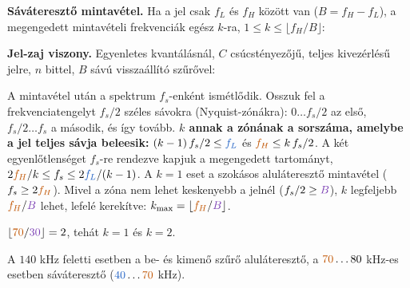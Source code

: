 \begin{elmelet}
\textbf{Sáváteresztő mintavétel.} Ha a jel csak $f_L$ és $f_H$ között van ($B=f_H-f_L$), a megengedett mintavételi frekvenciák egész $k$-ra, $1\le k\le\lfloor f_H/B\rfloor$:
\begin{center}\end{center}


\textbf{Jel-zaj viszony.} Egyenletes kvantálásnál, $C$ csúcstényezőjű, teljes kivezérlésű jelre, $n$ bittel, $B$ sávú visszaállító szűrővel:
\begin{center}\end{center}

\end{elmelet}

A mintavétel után a spektrum $f_s$-enként ismétlődik. Osszuk fel a frekvenciatengelyt $f_s/2$ széles sávokra (Nyquist-zónákra): $0\ldots f_s/2$ az első, $f_s/2\ldots f_s$ a második, és így tovább. \textbf{$k$ annak a zónának a sorszáma, amelybe a jel teljes sávja beleesik:} $(k-1)\,f_s/2\le {\ca{f_L}}$ és ${\cb{f_H}}\le k\,f_s/2$. A két egyenlőtlenséget $f_s$-re rendezve kapjuk a megengedett tartományt, $2{\cb{f_H}}/k\le f_s\le2{\ca{f_L}}/(k-1)$. A $k=1$ eset a szokásos aluláteresztő mintavétel ($f_s\ge2{\cb{f_H}}$). Mivel a zóna nem lehet keskenyebb a jelnél ($f_s/2\ge {\cc{B}}$), $k$ legfeljebb ${\cb{f_H}}/{\cc{B}}$ lehet, lefelé kerekítve: $k_{\max}=\lfloor {\cb{f_H}}/{\cc{B}}\rfloor$.

$\lfloor{\cb{70}}/{\cc{30}}\rfloor=2$, tehát $k=1$ és $k=2$.

\begin{center}\end{center}

\begin{center}\end{center}

A $140$ kHz feletti esetben a be- és kimenő szűrő aluláteresztő, a ${\cb{70}}\ldots80$ kHz-es esetben sáváteresztő (${\ca{40}}\ldots{\cb{70}}$ kHz).

